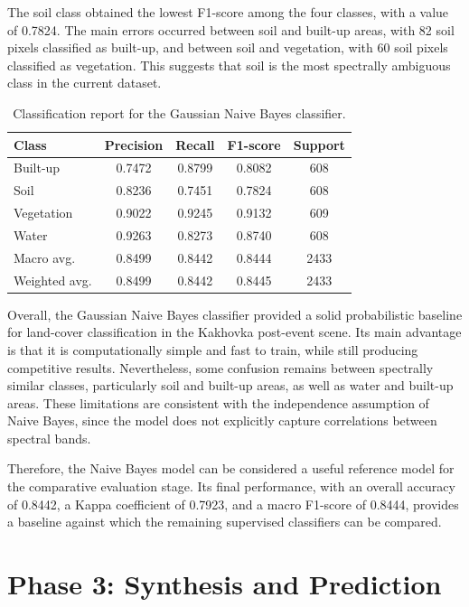 \documentclass{article}
\begin{document}
The soil class obtained the lowest F1-score among the four classes, with a value of 0.7824. The main errors occurred between soil and built-up areas, with 82 soil pixels classified as built-up, and between soil and vegetation, with 60 soil pixels classified as vegetation. This suggests that soil is the most spectrally ambiguous class in the current dataset.

\begin{table}[H]
\centering
\caption{Classification report for the Gaussian Naive Bayes classifier.}
\label{tab:nb_classification_report}
\begin{tabular}{lcccc}
\toprule
\textbf{Class} & \textbf{Precision} & \textbf{Recall} & \textbf{F1-score} & \textbf{Support} \\
\midrule
Built-up   & 0.7472 & 0.8799 & 0.8082 & 608 \\
Soil       & 0.8236 & 0.7451 & 0.7824 & 608 \\
Vegetation & 0.9022 & 0.9245 & 0.9132 & 609 \\
Water      & 0.9263 & 0.8273 & 0.8740 & 608 \\
\midrule
Macro avg.    & 0.8499 & 0.8442 & 0.8444 & 2433 \\
Weighted avg. & 0.8499 & 0.8442 & 0.8445 & 2433 \\
\bottomrule
\end{tabular}
\end{table}

Overall, the Gaussian Naive Bayes classifier provided a solid probabilistic baseline for land-cover classification in the Kakhovka post-event scene. Its main advantage is that it is computationally simple and fast to train, while still producing competitive results. Nevertheless, some confusion remains between spectrally similar classes, particularly soil and built-up areas, as well as water and built-up areas. These limitations are consistent with the independence assumption of Naive Bayes, since the model does not explicitly capture correlations between spectral bands.

Therefore, the Naive Bayes model can be considered a useful reference model for the comparative evaluation stage. Its final performance, with an overall accuracy of 0.8442, a Kappa coefficient of 0.7923, and a macro F1-score of 0.8444, provides a baseline against which the remaining supervised classifiers can be compared.

\section{Phase 3: Synthesis and Prediction}
\end{document}
